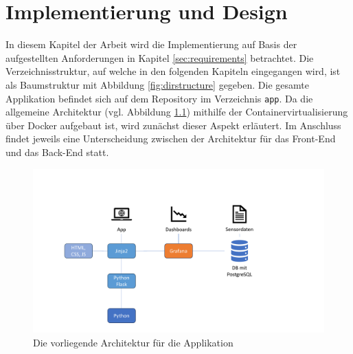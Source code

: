 \chapter{Implementierung und Design}
\label{sec:implementation}
In diesem Kapitel der Arbeit wird die Implementierung auf Basis der aufgestellten Anforderungen in Kapitel \ref{sec:requirements} betrachtet. Die Verzeichnisstruktur, auf welche in den folgenden Kapiteln eingegangen wird, ist als Baumstruktur mit Abbildung \ref{fig:dirstructure} gegeben. Die gesamte Applikation befindet sich auf dem Repository im Verzeichnis \texttt{app}. Da die allgemeine Architektur (vgl. Abbildung \ref{fig:architecture}) mithilfe der Containervirtualisierung über Docker aufgebaut ist, wird zunächst dieser Aspekt erläutert. Im Anschluss findet jeweils eine Unterscheidung zwischen der Architektur für das Front-End und das Back-End statt.

\begin{figure}[t]
    \centering
    \includegraphics[width=\widefigurewidth]{appendices/Architektur.pdf}
    \caption[Architektur]{Die vorliegende Architektur für die Applikation}
    \label{fig:architecture}
\end{figure}

